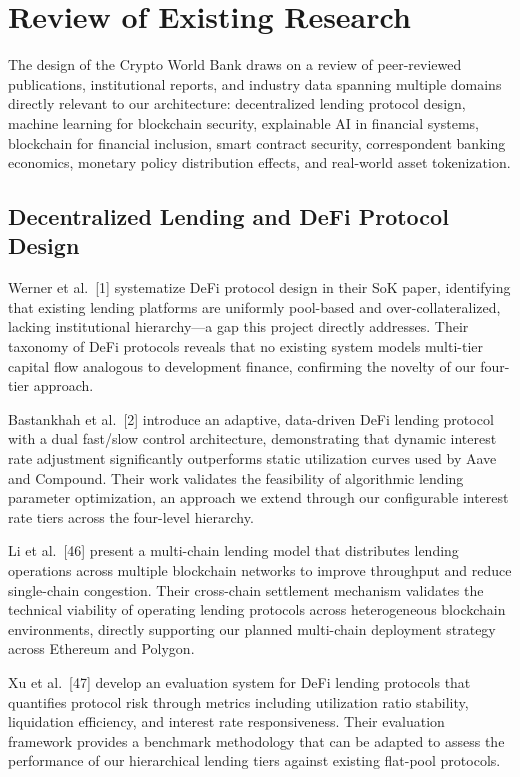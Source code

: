 \documentclass[12pt,a4paper]{report}
\begin{document}
\section{Review of Existing Research}

The design of the Crypto World Bank draws on a review of peer-reviewed publications, institutional reports, and industry data spanning multiple domains directly relevant to our architecture: decentralized lending protocol design, machine learning for blockchain security, explainable AI in financial systems, blockchain for financial inclusion, smart contract security, correspondent banking economics, monetary policy distribution effects, and real-world asset tokenization.

\subsection{Decentralized Lending and DeFi Protocol Design}

Werner et al.~[1] systematize DeFi protocol design in their SoK paper, identifying that existing lending platforms are uniformly pool-based and over-collateralized, lacking institutional hierarchy---a gap this project directly addresses. Their taxonomy of DeFi protocols reveals that no existing system models multi-tier capital flow analogous to development finance, confirming the novelty of our four-tier approach.

Bastankhah et al.~[2] introduce an adaptive, data-driven DeFi lending protocol with a dual fast/slow control architecture, demonstrating that dynamic interest rate adjustment significantly outperforms static utilization curves used by Aave and Compound. Their work validates the feasibility of algorithmic lending parameter optimization, an approach we extend through our configurable interest rate tiers across the four-level hierarchy.

Li et al.~[46] present a multi-chain lending model that distributes lending operations across multiple blockchain networks to improve throughput and reduce single-chain congestion. Their cross-chain settlement mechanism validates the technical viability of operating lending protocols across heterogeneous blockchain environments, directly supporting our planned multi-chain deployment strategy across Ethereum and Polygon.

Xu et al.~[47] develop an evaluation system for DeFi lending protocols that quantifies protocol risk through metrics including utilization ratio stability, liquidation efficiency, and interest rate responsiveness. Their evaluation framework provides a benchmark methodology that can be adapted to assess the performance of our hierarchical lending tiers against existing flat-pool protocols.
\end{document}
